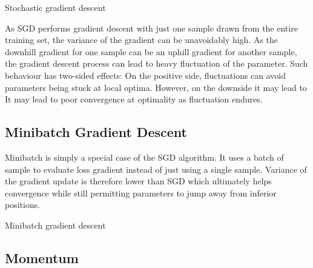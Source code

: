 \documentclass[11pt]{article} %
\theoremstyle{plain}
\theoremstyle{definition}
\begin{document}
\begin{appendices}
	\begin{algorithm}[H]
		\label{sgd}
		\caption{Stochastic gradient descent}
		
		
	\end{algorithm}
	
	As SGD performs gradient descent with just one sample drawn from the entire training set, the variance of the gradient can be unavoidably high. As the downhill gradient for one sample can be an uphill gradient for another sample, the gradient descent process can lead to heavy fluctuation of the parameter. Such behaviour has two-sided effects: On the positive side, fluctuations can avoid parameters being stuck at local optima. However, on the downside it may lead to It may lead to poor convergence at optimality as fluctuation endures.
	
	
	\subsection{Minibatch Gradient Descent}
	
	Minibatch is simply a special case of the SGD algorithm. It uses a batch of sample to evaluate loss gradient instead of just using a single sample. Variance of the gradient update is therefore lower than SGD which ultimately helps convergence while still permitting parameters to jump away from inferior positions.
	
	\begin{algorithm}[H]
		\label{minibatch}
		\caption{Minibatch gradient descent}
		
		
		\While{true}{
			Shuffle sample \(N\)\;
			
			\(i\leftarrow 0\)
			
			\While{\(i \leqslant \frac{N}{B}\) }{
				Draw a subset \((iB,  \min(N, (i+1)B)]\) from the sample\;
				Evaluate gradient with subset elements\;
				Update gradient\;
				\(i\leftarrow i+1\)
			}
		}
	\end{algorithm}
	
	
	\subsection{Momentum}
	

\end{appendices}
\end{document}
